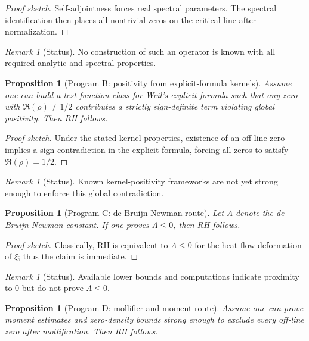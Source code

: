 \documentclass[11pt]{article}
\theoremstyle{plain}
\newtheorem{proposition}[theorem]{Proposition}
\theoremstyle{definition}
\theoremstyle{remark}
\newtheorem{remark}[theorem]{Remark}
\begin{document}
\begin{proof}[Proof sketch]
Self-adjointness forces real spectral parameters. The spectral identification then places all
nontrivial zeros on the critical line after normalization.
\end{proof}

\begin{remark}[Status]
No construction of such an operator is known with all required analytic and spectral properties.
\end{remark}

\begin{proposition}[Program B: positivity from explicit-formula kernels]
Assume one can build a test-function class for Weil's explicit formula such that any zero with
$\Re(\rho)\ne 1/2$ contributes a strictly sign-definite term violating global positivity.
Then RH follows.
\end{proposition}

\begin{proof}[Proof sketch]
Under the stated kernel properties, existence of an off-line zero implies a sign contradiction in the
explicit formula, forcing all zeros to satisfy $\Re(\rho)=1/2$.
\end{proof}

\begin{remark}[Status]
Known kernel-positivity frameworks are not yet strong enough to enforce this global contradiction.
\end{remark}

\begin{proposition}[Program C: de Bruijn-Newman route]
Let $\Lambda$ denote the de Bruijn-Newman constant. If one proves $\Lambda\le 0$, then RH follows.
\end{proposition}

\begin{proof}[Proof sketch]
Classically, RH is equivalent to $\Lambda\le 0$ for the heat-flow deformation of $\xi$; thus the claim is immediate.
\end{proof}

\begin{remark}[Status]
Available lower bounds and computations indicate proximity to $0$ but do not prove $\Lambda\le 0$.
\end{remark}

\begin{proposition}[Program D: mollifier and moment route]
Assume one can prove moment estimates and zero-density bounds strong enough to exclude every off-line
zero after mollification. Then RH follows.
\end{proposition}
\end{document}
